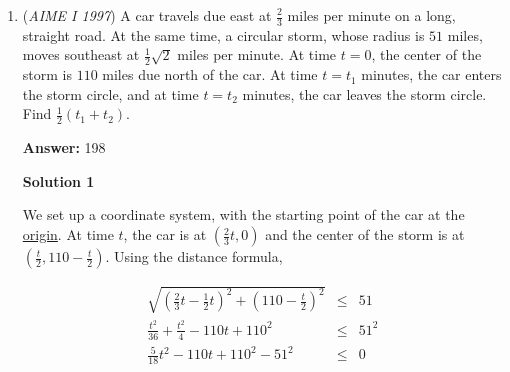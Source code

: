 \begin{enumerate}
 With this restriction of $m>6$, the larger $m$ gets, the smaller the fraction $\frac{6m}{m-6}$ becomes.  This can be proven either by calculus, by noting that $n = \frac{6m}{m-6}$ is a  transformed hyperbola, or by dividing out the rational function to get $n = 6 + \frac{36}{m - 6}.$

 Either way, minimizng $m$ will maximize $n$, and the smallest integer $m$ such that $n$ is positive is $m=7$, giving $n = \boxed{042}$




\textbf{Solution 3}

From the formula for the measure for an individual angle of a regular n-gon, $180 - \frac{360}{n}$, the measure of $\angle A_2A_1A_n = 180 - \frac{360}{n}$. Together with the fact that an equilateral triangle has angles measuring 60 degrees, the measure of $\angle A_nA_1B = 120 + \frac{360}{n}$ (Notice that this value decreases as $n$ increases; hence, we are looking for the least possible value of $\angle A_nA_1B$). For $A_n, A_1, B$ to be vertices of a regular polygon, $\angle A_nA_1B$ must be of the form $180 - \frac{360}{n}$, where $n$ is a natural number greater than or equal to 3. It is obvious that $\angle A_nA_1B > 120$. The least angle satisfying this condition is $180 - \frac{360}{7}$. Equating this with $120 + \frac{360}{n}$ and solving yields $n = \boxed{042}$



	\item (\textit{AIME I 1997}) A car travels due east at $\frac 23$ miles per minute on a long, straight road. At the same time, a circular storm, whose radius is $51$ miles, moves southeast at $\frac 12\sqrt{2}$ miles per minute. At time $t=0$, the center of the storm is $110$ miles due north of the car. At time $t=t_1$ minutes, the car enters the storm circle, and at time $t=t_2$ minutes, the car leaves the storm circle. Find $\frac 12(t_1+t_2)$.


 
 \textbf{Answer: }198



\textbf{Solution 1}

We set up a coordinate system, with the starting point of the car at the \href{https://artofproblemsolving.com/wiki/index.php?title=Origin}{origin}. At time $t$, the car is at $\left(\frac 23t,0\right)$ and the center of the storm is at $\left(\frac{t}{2}, 110 - \frac{t}{2}\right)$. Using the distance formula, 

 
 \begin{eqnarray*} \sqrt{\left(\frac{2}{3}t - \frac 12t\right)^2 + \left(110-\frac{t}{2}\right)^2} &\le& 51\\ \frac{t^2}{36} + \frac{t^2}{4} - 110t + 110^2 &\le& 51^2\\ \frac{5}{18}t^2 - 110t + 110^2 - 51^2 &\le& 0\\ \end{eqnarray*}


\end{enumerate}
